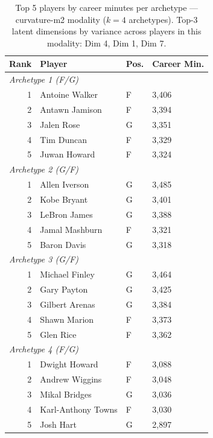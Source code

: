 \begin{table}[htbp]
  \centering\small
  \begin{tabular}{rlll}
    \toprule
    Rank & Player & Pos. & Career Min. \\
    \midrule
    \multicolumn{4}{l}{\textit{Archetype 1 (F/G)}} \\
    \midrule
    1 & Antoine Walker & F & 3,406 \\
    2 & Antawn Jamison & F & 3,394 \\
    3 & Jalen Rose & G & 3,351 \\
    4 & Tim Duncan & F & 3,329 \\
    5 & Juwan Howard & F & 3,324 \\
    \midrule[0.4pt]
    \multicolumn{4}{l}{\textit{Archetype 2 (G/F)}} \\
    \midrule
    1 & Allen Iverson & G & 3,485 \\
    2 & Kobe Bryant & G & 3,401 \\
    3 & LeBron James & G & 3,388 \\
    4 & Jamal Mashburn & F & 3,321 \\
    5 & Baron Davis & G & 3,318 \\
    \midrule[0.4pt]
    \multicolumn{4}{l}{\textit{Archetype 3 (G/F)}} \\
    \midrule
    1 & Michael Finley & G & 3,464 \\
    2 & Gary Payton & G & 3,425 \\
    3 & Gilbert Arenas & G & 3,384 \\
    4 & Shawn Marion & F & 3,373 \\
    5 & Glen Rice & F & 3,362 \\
    \midrule[0.4pt]
    \multicolumn{4}{l}{\textit{Archetype 4 (F/G)}} \\
    \midrule
    1 & Dwight Howard & F & 3,088 \\
    2 & Andrew Wiggins & F & 3,048 \\
    3 & Mikal Bridges & G & 3,036 \\
    4 & Karl-Anthony Towns & F & 3,030 \\
    5 & Josh Hart & G & 2,897 \\
    \bottomrule
  \end{tabular}
  \caption{Top 5 players by career minutes per archetype --- curvature-m2 modality ($k=4$ archetypes). Top-3 latent dimensions by variance across players in this modality: Dim 4, Dim 1, Dim 7.}
  \label{tab:arch_reps_curvature_m2}
\end{table}

